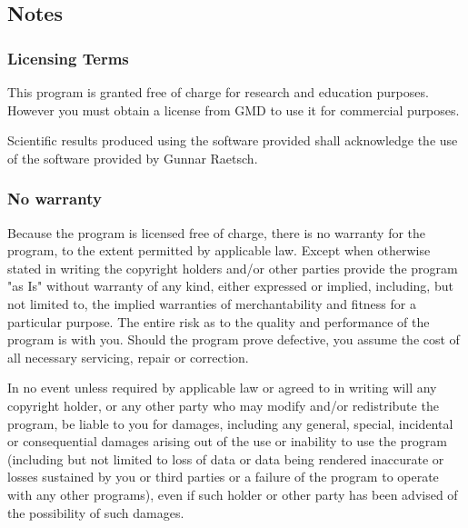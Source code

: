 \documentclass{article}
\begin{document}
\begin{appendix}
\subsection{Notes}
\label{app:terms}
\subsubsection{Licensing Terms}

This program is granted free of charge for research and education purposes.
However you must obtain a license from GMD to use it for commercial purposes.

Scientific results produced using the software provided shall acknowledge the
use of the software provided by Gunnar Raetsch.

\subsubsection{No warranty}

Because the program is licensed free of charge, there is no warranty for the
program, to the extent permitted by applicable law. Except when otherwise
stated in writing the copyright holders and/or other parties provide the
program "as Is" without warranty of any kind, either expressed or implied,
including, but not limited to, the implied warranties of merchantability and
fitness for a particular purpose. The entire risk as to the quality and
performance of the program is with you. Should the program prove defective,
you assume the cost of all necessary servicing, repair or correction.

In no event unless required by applicable law or agreed to in writing will any
copyright holder, or any other party who may modify and/or redistribute the
program, be liable to you for damages, including any general, special,
incidental or consequential damages arising out of the use or inability to use
the program (including but not limited to loss of data or data being rendered
inaccurate or losses sustained by you or third parties or a failure of the
program to operate with any other programs), even if such holder or other
party has been advised of the possibility of such damages.

\end{appendix}



\end{document}
